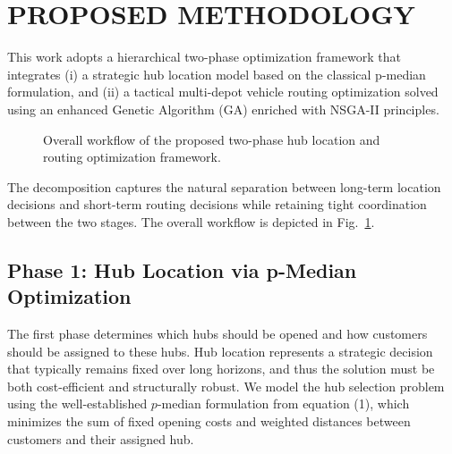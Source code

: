 \documentclass[conference]{IEEEtran}
\begin{document}
\section{PROPOSED METHODOLOGY}

This work adopts a hierarchical two-phase optimization framework that integrates (i) a strategic hub location model based on the classical p-median formulation, and (ii) a tactical multi-depot vehicle routing optimization solved using an enhanced Genetic Algorithm (GA) enriched with NSGA-II principles.

\begin{figure}[htbp]
\centering
{}
\caption{Overall workflow of the proposed two-phase hub location and routing optimization framework.}
\label{fig:workflow-flowchart}
\end{figure}

The decomposition captures the natural separation between long-term location decisions and short-term routing decisions while retaining tight coordination between the two stages. The overall workflow is depicted in Fig.~\ref{fig:workflow-flowchart}.

\subsection{Phase 1: Hub Location via p-Median Optimization}

The first phase determines which hubs should be opened and how customers should be assigned to these hubs. Hub location represents a strategic decision that typically remains fixed over long horizons, and thus the solution must be both cost-efficient and structurally robust. We model the hub selection problem using the well-established $p$-median formulation from equation (1), which minimizes the sum of fixed opening costs and weighted distances between customers and their assigned hub.
\end{document}

